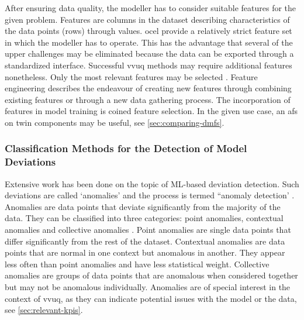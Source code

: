 After ensuring data quality, the modeller has to consider suitable features for the given problem. Features are columns in the dataset describing characteristics of the data points (rows) through values. \gls{ocel} provide a relatively strict feature set in which the modeller has to operate. This has the advantage that several of the upper challenges may be eliminated because the data can be exported through a standardized interface. Successful \gls{vvuq} methods may require additional features nonetheless. Only the most relevant features may be selected \autocite{geron2022hands}. Feature engineering describes the endeavour of creating new features through combining existing features or through a new data gathering process. The incorporation of features in model training is coined feature selection. In the given use case, an \gls{afs} on twin components may be useful, see \autoref{sec:comparing-dmfs}.

\subsubsection*{Classification Methods for the Detection of Model Deviations}
\label{sec:classification-methods}
Extensive work has been done on the topic of ML-based deviation detection. Such deviations are called `anomalies' and the process is termed ``anomaly detection' \autocite{kharitonov2022comparative}. Anomalies are data points that deviate significantly from the majority of the data. They can be classified into three categories: point anomalies, contextual anomalies and collective anomalies \autocite{chandola2009anomaly}. Point anomalies are single data points that differ significantly from the rest of the dataset. Contextual anomalies are data points that are normal in one context but anomalous in another. They appear less often than point anomalies and have less statistical weight. Collective anomalies are groups of data points that are anomalous when considered together but may not be anomalous individually. Anomalies are of special interest in the context of \gls{vvuq}, as they can indicate potential issues with the model or the data, see \autoref{sec:relevant-kpis}.

